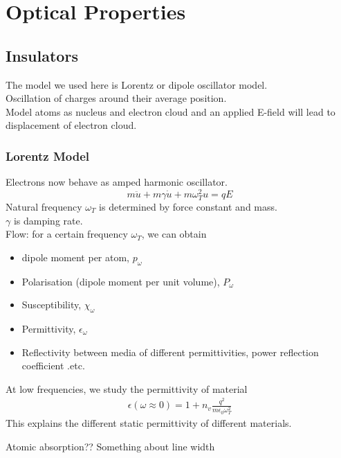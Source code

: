 \documentclass[12pt,a4paper]{article}
\title{\topic}
\begin{document}
\begin{titlepage}
    \maketitle
\end{titlepage}

\tableofcontents

\newpage

\begin{abstract}
\noindent
Abstract of this course
\end{abstract}

\section{Optical Properties}
\subsection{Insulators}
    The model we used here is Lorentz or dipole oscillator model.\\
    \indent Oscillation of charges around their average position.\\
    \indent Model atoms as nucleus and electron cloud and an applied E-field will lead to displacement of electron cloud.\\
    \subsubsection{Lorentz Model}
        Electrons now behave as amped harmonic oscillator.\\
        \begin{equation}
            m \ddot{u} + m\gamma\dot{u} + m\omega_T^2 u = qE
        \end{equation}
        Natural frequency $\omega_T$ is determined by force constant and mass.\\
        $\gamma$ is damping rate.\\
        Flow: for a certain frequency $\omega_T$, we can obtain
        \begin{itemize}
            \item {dipole moment per atom, $p_\omega$}
            \item {Polarisation (dipole moment per unit volume), $P_\omega$}
            \item {Susceptibility, $\chi_\omega$}
            \item {Permittivity, $\epsilon_\omega$}
            \item {Reflectivity between media of different permittivities, power reflection coefficient .etc.}
        \end{itemize}
        At low frequencies, we study the permittivity of material
        \begin{align}
            \epsilon (\omega\approx 0) = 1+ n_v \frac{q^2}{m\epsilon_0\omega_T^2}
        \end{align}
        This explains the different static permittivity of different materials.\\
        \begin{example}
            {Atomic absorption}{?? Something about line width}
        \end{example}
\end{document}
